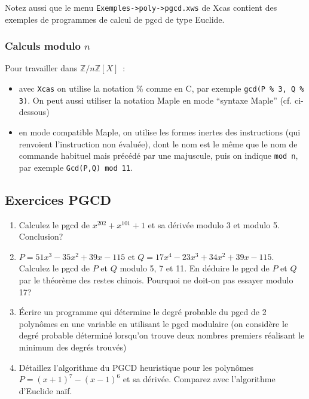 \documentclass[a4paper,11pt]{article}
\begin{document}
\begin{giacjshere}
Notez aussi que le menu \verb|Exemples->poly->pgcd.xws| de Xcas contient 
des exemples de programmes de calcul de pgcd de type Euclide.

\subsubsection{Calculs modulo $n$}
Pour travailler dans $\mathbb{Z}/n\mathbb{Z}[X]$~:
\begin{itemize}
\item avec \verb|Xcas| on utilise la notation \% comme en C, par
exemple {\tt gcd(P \% 3, Q \% 3)}. On peut aussi utiliser la notation
Maple en mode ``syntaxe Maple'' (cf. ci-dessous)
\item en mode compatible Maple,
on utilise les formes inertes des instructions (qui renvoient l'instruction
non \'evalu\'ee), dont le nom est le m\^eme que le nom de commande
habituel mais pr\'ec\'ed\'e par une majuscule, puis on indique
\verb|mod n|, par exemple \verb|Gcd(P,Q) mod 11|.
\end{itemize}

\pagebreak

\subsection{Exercices PGCD}
\begin{enumerate}

\item Calculez le pgcd de $x^{202}+x^{101}+1$
et sa dérivée modulo 3 et modulo 5. Conclusion?

\item $P=51x^3-35x^2+39x-115$ et $Q=17x^4-23x^3+34x^2+39x-115$.
Calculez le pgcd de $P$ et $Q$ modulo 5, 7 et 11. En déduire
le pgcd de $P$ et $Q$ par le théorème des restes chinois. Pourquoi
ne doit-on pas essayer modulo 17?

\item \'Ecrire un programme qui d\'etermine le degr\'e probable
du pgcd de 2 polyn\^omes en une variable en utilisant le pgcd modulaire 
(on consid\`ere le degr\'e probable d\'etermin\'e lorsqu'on trouve
deux nombres premiers r\'ealisant le minimum des degr\'es trouv\'es)

\item Détaillez l'algorithme du PGCD heuristique pour les
polynômes  $P=(x+1)^7-(x-1)^6$ et sa dérivée. Comparez avec l'algorithme
d'Euclide naïf.


\end{enumerate}
\end{giacjshere}
\end{document}
